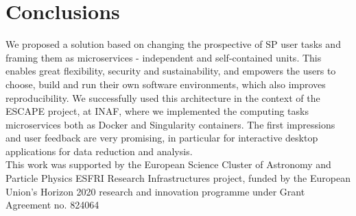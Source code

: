 \documentclass[11pt,twoside]{article}
\begin{document}
\section{Conclusions}

We proposed a solution based on changing the prospective of SP user tasks and framing them as microservices - independent and self-contained units. This enables great flexibility, security and sustainability, and empowers the users to choose, build and run their own software environments, which also improves reproducibility. We successfully used this architecture in the context of the ESCAPE project, at INAF, where we implemented the computing tasks microservices both as Docker and Singularity containers. The first impressions and user feedback are very promising, in particular for interactive desktop applications for data reduction and analysis.\\




\acknowledgements This work was supported by the European Science Cluster of Astronomy and Particle Physics ESFRI Research Infrastructures project, funded by the European Union's Horizon 2020 research and innovation programme under Grant Agreement no. 824064




\end{document}
